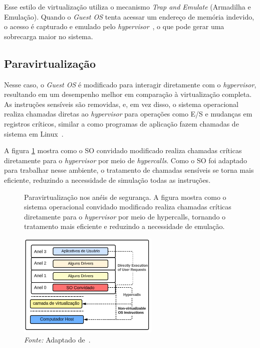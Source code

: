 Esse estilo de virtualização utiliza o mecanismo \textit{Trap and Emulate} (Armadilha e Emulação). Quando o \textit{Guest OS} tenta acessar um endereço de memória indevido, o acesso é capturado e emulado pelo \textit{hypervisor}~\citep{chirammal2016mastering}, o que pode gerar uma sobrecarga maior no sistema.

\subsection{Paravirtualização}

Nesse caso, o \textit{Guest OS} é modificado para interagir diretamente com o \textit{hypervisor}, resultando em um desempenho melhor em comparação à virtualização completa. As instruções sensíveis são removidas, e, em vez disso, o sistema operacional realiza chamadas diretas ao \textit{hypervisor} para operações como E/S e mudanças em registros críticos, similar a como programas de aplicação fazem chamadas de sistema em Linux~\citep{modernOS}.

A figura \ref{fig:paravirtualization_rings} mostra como o SO convidado modificado realiza chamadas críticas diretamente para o \textit{hypervisor} por meio de \textit{hypercalls}. Como o SO foi adaptado para trabalhar nesse ambiente, o tratamento de chamadas sensíveis se torna mais eficiente, reduzindo a necessidade de simulação todas as instruções.

\begin{figure}[htbp]
  \centering
  \caption{Paravirtualização nos anéis de segurança. A figura mostra como o sistema operacional convidado modificado realiza chamadas críticas diretamente para o \textit{hypervisor} por meio de hypercalls, tornando o tratamento mais eficiente e reduzindo a necessidade de emulação.}
  \includegraphics[width=0.6\textwidth]{images/paravirtualization_rings.png}
  \caption*{\textit{Fonte:} Adaptado de~\citep{chirammal2016mastering}.}
  \label{fig:paravirtualization_rings}
\end{figure}

